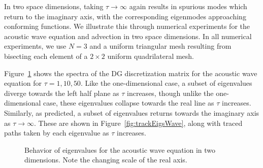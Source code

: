 \documentclass[10pt]{article}
\begin{document}
In two space dimensions, taking $\tau\rightarrow \infty$ again results in spurious modes which return to the imaginary axis, with the corresponding eigenmodes approaching conforming functions.  We illustrate this through numerical experiments for the acoustic wave equation and advection in two space dimensions.  In all numerical experiments, we use $N=3$ and a uniform triangular mesh resulting from bisecting each element of a $2\times 2$ uniform quadrilateral mesh.  

Figure~\ref{fig:waveeigs} shows the spectra of the DG discretization matrix for the acoustic wave equation for $\tau = 1, 10, 50$.  Like the one-dimensional case, a subset of eigenvalues diverge towards the left half plane as $\tau$ increases, though unlike the one-dimensional case, these eigenvalues collapse towards the real line as $\tau$ increases.  Similarly, as predicted, a subset of eigenvalues returns towards the imaginary axis as $\tau \rightarrow \infty$.  These are shown in Figure~\ref{fig:trackEigsWave}, along with traced paths taken by each eigenvalue as $\tau$ increases.  

\begin{figure}
\centering
{}
\hspace{.5em}
\hspace{.5em}
\caption{Behavior of eigenvalues for the acoustic wave equation in two dimensions. Note the changing scale of the real axis.}
\label{fig:waveeigs}
\end{figure}
\end{document}
